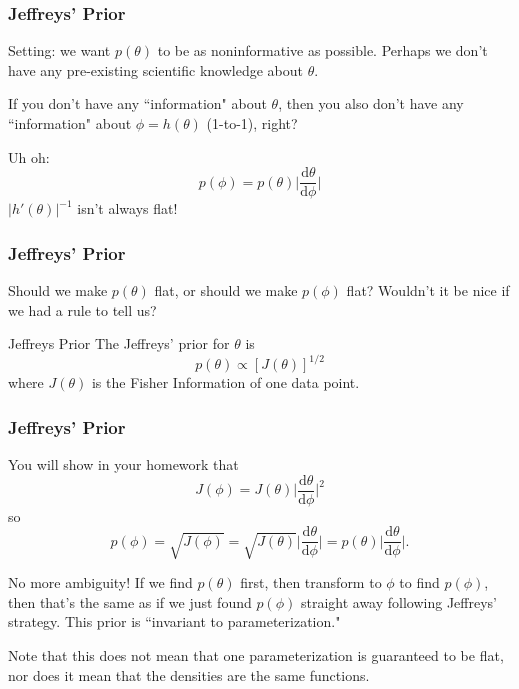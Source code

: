 \documentclass{beamer}
\begin{document}
\begin{frame}[fragile]
\frametitle{Jeffreys' Prior}

Setting: we want $p(\theta)$ to be as noninformative as possible. Perhaps we don't have any pre-existing scientific knowledge about $\theta$. 
\newline

If you don't have any ``information" about $\theta$, then you also don't have any ``information" about $\phi = h(\theta)$ (1-to-1), right?
\newline
\pause

Uh oh:
\[
p(\phi) = p(\theta) \bigg\rvert \frac{\text{d}\theta}{\text{d}\phi } \bigg\rvert 
\]
$|h'(\theta)|^{-1}$ isn't always flat!

\end{frame}



\begin{frame}[fragile]
\frametitle{Jeffreys' Prior}

Should we make $p(\theta)$ flat, or should we make $p(\phi)$ flat? Wouldn't it be nice if we had a rule to tell us? 
\newline


\begin{block}{Jeffreys Prior}
The Jeffreys' prior for $\theta$ is 
\[
p(\theta) \propto [J(\theta)]^{1/2}
\]
where $J(\theta)$ is the Fisher Information of one data point.
\end{block}

\end{frame}


\begin{frame}[fragile]
\frametitle{Jeffreys' Prior}

You will show in your homework that 
\[
J(\phi) = J(\theta) \bigg\rvert \frac{\text{d}\theta}{ \text{d}\phi } \bigg\rvert^2
\]
so 
\[
p(\phi) = \sqrt{J(\phi)} = \sqrt{J(\theta)} \bigg\rvert \frac{\text{d}\theta}{ \text{d}\phi } \bigg\rvert = p(\theta) \bigg\rvert \frac{\text{d}\theta}{ \text{d}\phi } \bigg\rvert.
\]


No more ambiguity! If we find $p(\theta)$ first, then transform to $\phi$ to find $p(\phi)$, then that's the same as if we just found $p(\phi)$ straight away following Jeffreys' strategy. This prior is ``invariant to parameterization." 
\newline

Note that this does not mean that one parameterization is guaranteed to be flat, nor does it mean that the densities are the same functions.

\end{frame}
\end{document}
